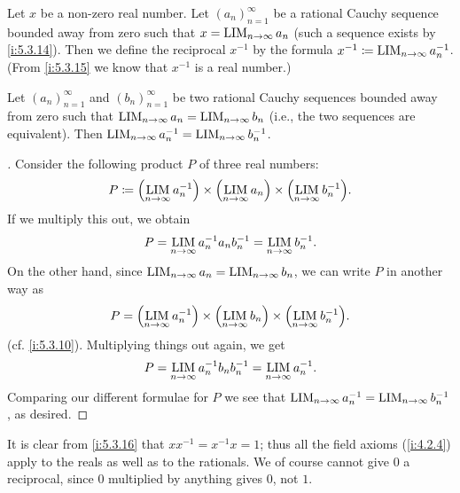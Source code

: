 \begin{defn}\label{i:5.3.16}
  Let \(x\) be a non-zero real number.
  Let \((a_n)_{n = 1}^{\infty}\) be a rational Cauchy sequence bounded away from zero such that \(x = \operatorname*{LIM}_{n \to \infty} a_n\) (such a sequence exists by \cref{i:5.3.14}).
  Then we define the reciprocal \(x^{-1}\) by the formula \(x^{-1} \coloneqq \operatorname*{LIM}_{n \to \infty} a_n^{-1}\).
  (From \cref{i:5.3.15} we know that \(x^{-1}\) is a real number.)
\end{defn}

\begin{lem}\label{i:5.3.17}
  Let \((a_n)_{n = 1}^{\infty}\) and \((b_n)_{n = 1}^{\infty}\) be two rational Cauchy sequences bounded away from zero such that \(\operatorname*{LIM}_{n \to \infty} a_n = \operatorname*{LIM}_{n \to \infty} b_n\) (i.e., the two sequences are equivalent).
  Then \(\operatorname*{LIM}_{n \to \infty} a_n^{-1} = \operatorname*{LIM}_{n \to \infty} b_n^{-1}\).
\end{lem}

\begin{proof}[]
  Consider the following product \(P\) of three real numbers:
  \[
    P \coloneqq \pa{\LIM_{n \to \infty} a_n^{-1}} \times \pa{\LIM_{n \to \infty} a_n} \times \pa{\LIM_{n \to \infty} b_n^{-1}}.
  \]
  If we multiply this out, we obtain
  \[
    P = \operatorname*{LIM}_{n \to \infty} a_n^{-1} a_n b_n^{-1} = \operatorname*{LIM}_{n \to \infty} b_n^{-1}.
  \]
  On the other hand, since \(\operatorname*{LIM}_{n \to \infty} a_n = \operatorname*{LIM}_{n \to \infty} b_n\), we can write \(P\) in another way as
  \[
    P = \pa{\LIM_{n \to \infty} a_n^{-1}} \times \pa{\LIM_{n \to \infty} b_n} \times \pa{\LIM_{n \to \infty} b_n^{-1}}.
  \]
  (cf. \cref{i:5.3.10}).
  Multiplying things out again, we get
  \[
    P = \operatorname*{LIM}_{n \to \infty} a_n^{-1} b_n b_n^{-1} = \operatorname*{LIM}_{n \to \infty} a_n^{-1}.
  \]
  Comparing our different formulae for \(P\) we see that \(\operatorname*{LIM}_{n \to \infty} a_n^{-1} = \operatorname*{LIM}_{n \to \infty} b_n^{-1}\), as desired.
\end{proof}

\begin{ac}\label{i:ac:5.3.3}
  It is clear from \cref{i:5.3.16} that \(x x^{-1} = x^{-1} x = 1\);
  thus all the field axioms (\cref{i:4.2.4}) apply to the reals as well as to the rationals.
  We of course cannot give \(0\) a reciprocal, since \(0\) multiplied by anything gives \(0\), not \(1\).
\end{ac}

